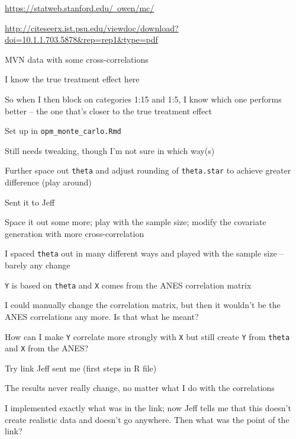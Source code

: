 \documentclass[12pt]{article}
\begin{document}
\begin{coi}
\begin{coi}
\begin{coi}
						\item \href{https://statweb.stanford.edu/~owen/mc/}{https://statweb.stanford.edu/~owen/mc/}
						\item \href{http://citeseerx.ist.psu.edu/viewdoc/download?doi=10.1.1.703.5878&rep=rep1&type=pdf}{http://citeseerx.ist.psu.edu/viewdoc/download?doi=10.1.1.703.5878\&rep=rep1\&type=pdf}
					\end{coi}
				\item MVN data with some cross-correlations
				\item I know the true treatment effect here
				\item So when I then block on categories 1:15 and 1:5, I know which one performs better -- the one that's closer to the true treatment effect
				\item Set up in \texttt{opm\_monte\_carlo.Rmd}
				\item Still needs tweaking, though I'm not sure in which way(s)
				\item Further space out \texttt{theta} and adjust rounding of \texttt{theta.star} to achieve greater difference (play around)
				\item Sent it to Jeff
				\item Space it out some more; play with the sample size; modify the covariate generation with more cross-correlation
					\begin{coi}
						\item I spaced \texttt{theta} out in many different ways and played with the sample size -- barely any change
						\item \texttt{Y} is based on \texttt{theta} and \texttt{X} comes from the ANES correlation matrix
						\item I could manually change the correlation matrix, but then it wouldn't be the ANES correlations any more. Is that what he meant?
						\item How can I make \texttt{Y} correlate more strongly with \texttt{X} but still create \texttt{Y} from \texttt{theta} and \texttt{X} from the ANES?
						\item Try link Jeff sent me (first steps in R file)
						\item The results never really change, no matter what I do with the correlations
						\item I implemented exactly what was in the link; now Jeff tells me that this doesn't create realistic data and doesn't go anywhere. Then what was the point of the link?
					\end{coi}

\end{coi}
\end{coi}
\end{document}
